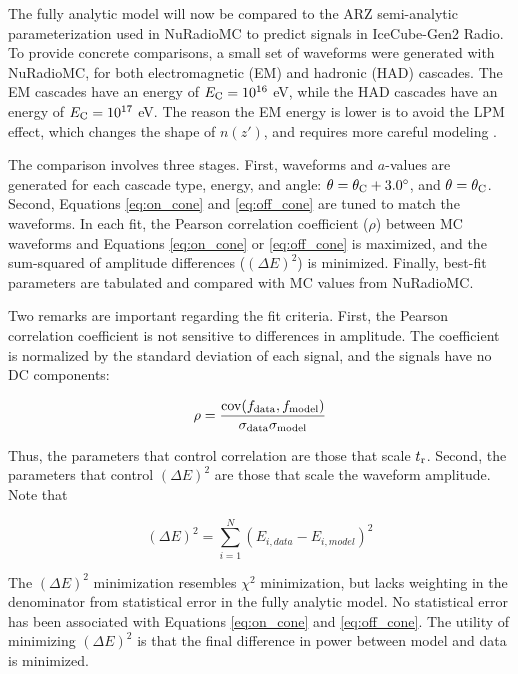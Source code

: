 \documentclass[amsmath,amssymb,aps,prd,10pt,twocolumn]{revtex4}
\DeclareMathOperator\cov{cov}
\begin{document}
The fully analytic model will now be compared to the ARZ semi-analytic parameterization used in NuRadioMC \cite{PhysRevD.101.083005} to predict signals in IceCube-Gen2 Radio.  To provide concrete comparisons, a small set of waveforms were generated with NuRadioMC, for both electromagnetic (EM) and hadronic (HAD) cascades.  The EM cascades have an energy of $E_{\rm C} = 10^{16}$ eV, while the HAD cascades have an energy of $E_{\rm C} = 10^{17}$ eV.  The reason the EM energy is lower is to avoid the LPM effect, which changes the shape of $n(z')$, and requires more careful modeling \cite{10.1016/j.astropartphys.2017.03.008}.

The comparison involves three stages.  First, waveforms and $a$-values are generated for each cascade type, energy, and angle: $\theta = \theta_{\rm C} + 3.0^{\circ}$, and $\theta = \theta_{\rm C}$.  Second, Equations \ref{eq:on_cone} and \ref{eq:off_cone} are tuned to match the waveforms.  In each fit, the Pearson correlation coefficient ($\rho$) between MC waveforms and Equations \ref{eq:on_cone} or \ref{eq:off_cone} is maximized, and the sum-squared of amplitude differences ($(\Delta E)^2$) is minimized.  Finally, best-fit parameters are tabulated and compared with MC values from NuRadioMC. 

Two remarks are important regarding the fit criteria.  First, the Pearson correlation coefficient is not sensitive to differences in amplitude.  The coefficient is normalized by the standard deviation of each signal, and the signals have no DC components:

\begin{equation}
\rho = \frac{\cov(f_{\rm data},f_{\rm model})}{\sigma_{\rm data} \sigma_{\rm model}}
\end{equation}

Thus, the parameters that control correlation are those that scale $t_{\rm r}$.  Second, the parameters that control $(\Delta E)^2$ are those that scale the waveform amplitude.  Note that

\begin{equation}
(\Delta E)^2 = \sum_{i = 1}^{N} (E_{i,data} - E_{i,model})^2
\end{equation}

The $(\Delta E)^2$ minimization resembles $\chi^2$ minimization, but lacks weighting in the denominator from statistical error in the fully analytic model.  No statistical error has been associated with Equations \ref{eq:on_cone} and \ref{eq:off_cone}.  The utility of minimizing $(\Delta E)^2$ is that the final difference in power between model and data is minimized.
\end{document}
